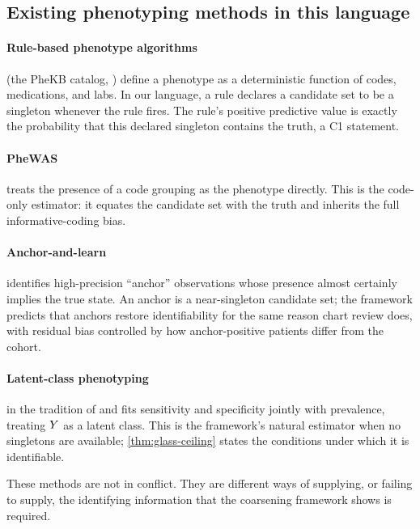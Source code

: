 \subsection{Existing phenotyping methods in this language}

\paragraph{Rule-based phenotype algorithms} (the PheKB catalog,
\citealp{kirby2016phekb}) define a phenotype as a deterministic
function of codes, medications, and labs. In our language, a rule
declares a candidate set to be a singleton whenever the rule fires.
The rule's positive predictive value is exactly the probability that
this declared singleton contains the truth, a C1 statement.

\paragraph{PheWAS} \citep{denny2010phewas} treats the presence of a
code grouping as the phenotype directly. This is the code-only
estimator: it equates the candidate set with the truth and inherits
the full informative-coding bias.

\paragraph{Anchor-and-learn} \citep{halpern2016anchor} identifies
high-precision ``anchor'' observations whose presence almost certainly
implies the true state. An anchor is a near-singleton candidate set;
the framework predicts that anchors restore identifiability for the
same reason chart review does, with residual bias controlled by how
anchor-positive patients differ from the cohort.

\paragraph{Latent-class phenotyping} in the tradition of
\citet{hui1980estimating} and \citet{dawid1979maximum} fits
sensitivity and specificity jointly with prevalence, treating $Y$ as a
latent class. This is the framework's natural estimator when no
singletons are available; \cref{thm:glass-ceiling} states the
conditions under which it is identifiable.

These methods are not in conflict. They are different ways of
supplying, or failing to supply, the identifying information that the
coarsening framework shows is required.

